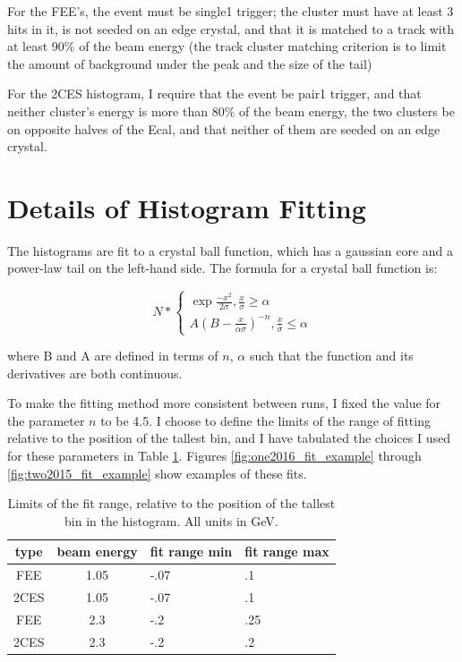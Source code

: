 \documentclass[11pt]{article}
\begin{document}
For the FEE's, the event must be single1 trigger; the cluster must have at least 3 hits in it, is not seeded on an edge crystal, and that it is matched to a track with at least 90\% of the beam energy (the track cluster matching criterion is to limit the amount of background under the peak and the size of the tail)

For the 2CES histogram, I require that the event be pair1 trigger, and that neither cluster's energy is more than 80\% of the beam energy, the two clusters be on opposite halves of the Ecal, and that neither of them are seeded on an edge crystal.   

\section{Details of Histogram Fitting}
The histograms are fit to a crystal ball function, which has a gaussian core and a power-law tail on the left-hand side.   The formula for a crystal ball function is:

\begin{equation}
N*\begin{cases}
\exp{\frac{-x^2}{2\sigma}},  \frac{x}{\sigma} \ge \alpha\\
A\left(B-\frac{x}{\alpha\sigma}\right)^{-n}, \frac{x}{\sigma} \le \alpha
\end{cases}
\label{eq:crystalball}
\end{equation}

where B and A are defined in terms of $n$, $\alpha$ such that the function and its derivatives are both continuous.

To make the fitting method more consistent between runs, I fixed the value for the parameter $n$ to be 4.5.    I choose to define the limits of the range of fitting relative to the position of the tallest bin, and I have tabulated the choices I used for these parameters in Table \ref{tab:fit_range_limits}.  Figures \ref{fig:one2016_fit_example} through \ref{fig:two2015_fit_example} show examples of these fits.  


\begin{table}[htp]
\caption{Limits of the fit range, relative to the position of the tallest bin in the histogram.  All units in GeV.}
\begin{center}
\begin{tabular}{|c|c|l|l|}
\hline
type & beam energy & fit range min & fit range max \\
\hline
FEE & 1.05 & -.07 & .1 \\
2CES & 1.05 & -.07 & .1 \\ 
FEE & 2.3 & -.2 & .25 \\
2CES & 2.3 & -.2 & .2 \\

\hline
\end{tabular}
\end{center}
\label{tab:fit_range_limits}
\end{table}%
\end{document}
